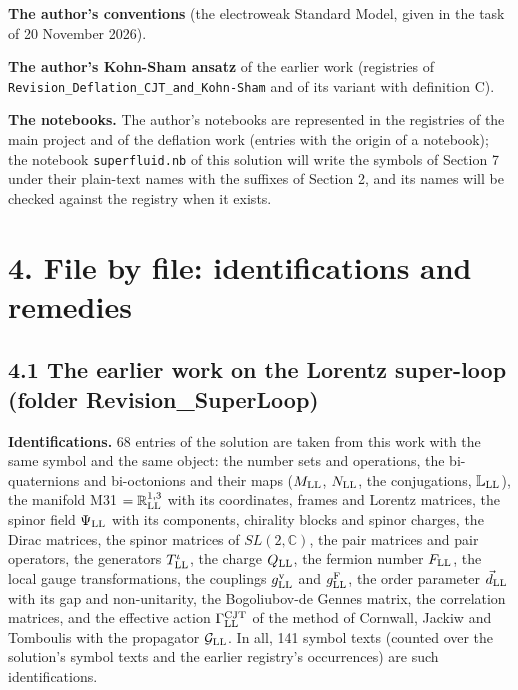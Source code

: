 \documentclass[
  10pt,
]{article}
\begin{document}
\textbf{The author's conventions} (the electroweak Standard Model, given
in the task of 20 November 2026).

\textbf{The author's Kohn-Sham ansatz} of the earlier work (registries
of \texttt{Revision\_Deflation\_CJT\_and\_Kohn-Sham} and of its variant
with definition C).

\textbf{The notebooks.} The author's notebooks are represented in the
registries of the main project and of the deflation work (entries with
the origin of a notebook); the notebook \texttt{superfluid.nb} of this
solution will write the symbols of Section 7 under their plain-text
names with the suffixes of Section 2, and its names will be checked
against the registry when it exists.

\hypertarget{file-by-file-identifications-and-remedies}{%
\section{4. File by file: identifications and
remedies}\label{file-by-file-identifications-and-remedies}}

\hypertarget{the-earlier-work-on-the-lorentz-super-loop-folder-revision_superloop}{%
\subsection{4.1 The earlier work on the Lorentz super-loop (folder
Revision\_SuperLoop)}\label{the-earlier-work-on-the-lorentz-super-loop-folder-revision_superloop}}

\textbf{Identifications.} 68 entries of the solution are taken from this
work with the same symbol and the same object: the number sets and
operations, the bi-quaternions and bi-octonions and their maps
(\(M_{\rm LL}\), \(N_{\rm LL}\), the conjugations,
\(\mathbb L_{\rm LL}\)), the manifold M31 \(=\mathbb R^{1,3}_{\rm LL}\)
with its coordinates, frames and Lorentz matrices, the spinor field
\(\Psi_{\rm LL}\) with its components, chirality blocks and spinor
charges, the Dirac matrices, the spinor matrices of \(SL(2,\mathbb C)\),
the pair matrices and pair operators, the generators
\(T^\iota_{\rm LL}\), the charge \(Q_{\rm LL}\), the fermion number
\(F_{\rm LL}\), the local gauge transformations, the couplings
\(g^{\rm v}_{\rm LL}\) and \(g^{\rm F}_{\rm LL}\), the order parameter
\(\vec d_{\rm LL}\) with its gap and non-unitarity, the Bogoliubov-de
Gennes matrix, the correlation matrices, and the effective action
\(\Gamma^{\rm CJT}_{\rm LL}\) of the method of Cornwall, Jackiw and
Tomboulis with the propagator \(\mathcal G_{\rm LL}\). In all, 141
symbol texts (counted over the solution's symbol texts and the earlier
registry's occurrences) are such identifications.
\end{document}
